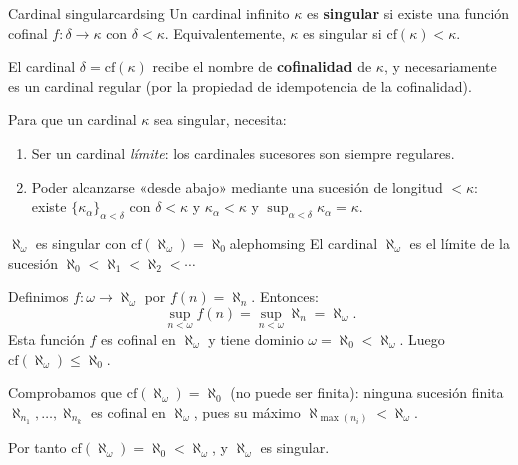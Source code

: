 \begin{definicion}{Cardinal singular}{cardsing}
Un cardinal infinito $\kappa$ es \textbf{singular} si existe una función cofinal $f \colon \delta \to \kappa$ con $\delta < \kappa$. Equivalentemente, $\kappa$ es singular si $\mathrm{cf}(\kappa) < \kappa$.

El cardinal $\delta = \mathrm{cf}(\kappa)$ recibe el nombre de \textbf{cofinalidad} de $\kappa$, y necesariamente es un cardinal regular (por la propiedad de idempotencia de la cofinalidad).
\end{definicion}

\begin{importante}
Para que un cardinal $\kappa$ sea singular, necesita:
\begin{enumerate}[leftmargin=2em, label=(\arabic*)]
  \item Ser un cardinal \emph{límite}: los cardinales sucesores son siempre regulares.
  \item Poder alcanzarse «desde abajo» mediante una sucesión de longitud $< \kappa$: existe $\{\kappa_\alpha\}_{\alpha < \delta}$ con $\delta < \kappa$ y $\kappa_\alpha < \kappa$ y $\sup_{\alpha<\delta} \kappa_\alpha = \kappa$.
\end{enumerate}
\end{importante}

\begin{ejemplo}{$\aleph_\omega$ es singular con $\mathrm{cf}(\aleph_\omega) = \aleph_0$}{alephomsing}
El cardinal $\aleph_\omega$ es el límite de la sucesión $\aleph_0 < \aleph_1 < \aleph_2 < \cdots$

Definimos $f \colon \omega \to \aleph_\omega$ por $f(n) = \aleph_n$. Entonces:
\[
  \sup_{n < \omega} f(n) = \sup_{n < \omega} \aleph_n = \aleph_\omega.
\]
Esta función $f$ es cofinal en $\aleph_\omega$ y tiene dominio $\omega = \aleph_0 < \aleph_\omega$. Luego $\mathrm{cf}(\aleph_\omega) \leq \aleph_0$.

Comprobamos que $\mathrm{cf}(\aleph_\omega) = \aleph_0$ (no puede ser finita): ninguna sucesión finita $\aleph_{n_1}, \ldots, \aleph_{n_k}$ es cofinal en $\aleph_\omega$, pues su máximo $\aleph_{\max(n_i)} < \aleph_\omega$.

Por tanto $\mathrm{cf}(\aleph_\omega) = \aleph_0 < \aleph_\omega$, y $\aleph_\omega$ es singular.
\end{ejemplo}

